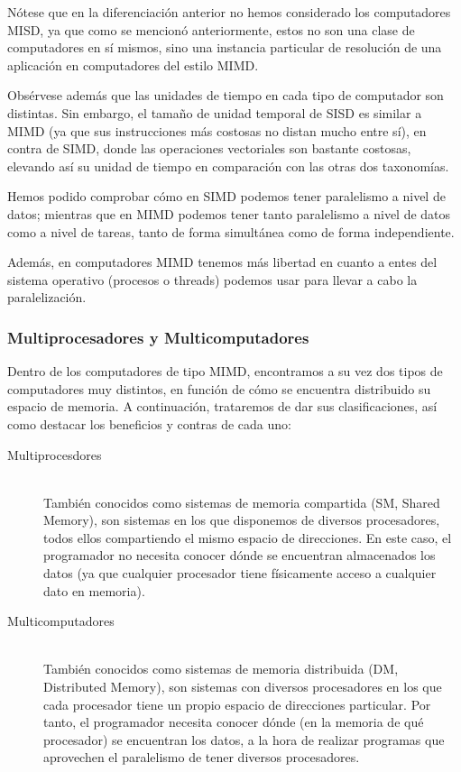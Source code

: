 \begin{observacion}
    Nótese que en la diferenciación anterior no hemos considerado los computadores MISD, ya que como se mencionó anteriormente, estos no son una clase de computadores en sí mismos, sino una instancia particular de resolución de una aplicación en computadores del estilo MIMD.

    Obsérvese además que las unidades de tiempo en cada tipo de computador son distintas. Sin embargo, el tamaño de unidad temporal de SISD es similar a MIMD (ya que sus instrucciones más costosas no distan mucho entre sí), en contra de SIMD, donde las operaciones vectoriales son bastante costosas, elevando así su unidad de tiempo en comparación con las otras dos taxonomías.

    Hemos podido comprobar cómo en SIMD podemos tener paralelismo a nivel de datos; mientras que en MIMD podemos tener tanto paralelismo a nivel de datos como a nivel de tareas, tanto de forma simultánea como de forma independiente.

    Además, en computadores MIMD tenemos más libertad en cuanto a entes del sistema operativo (procesos o threads) podemos usar para llevar a cabo la paralelización.
\end{observacion}

\subsubsection{Multiprocesadores y Multicomputadores}
Dentro de los computadores de tipo MIMD, encontramos a su vez dos tipos de computadores muy distintos, en función de cómo se encuentra distribuido su espacio de memoria. A continuación, trataremos de dar sus clasificaciones, así como destacar los beneficios y contras de cada uno:
\begin{description}
    \item [Multiprocesdores]~\\
        También conocidos como sistemas de memoria compartida (SM, Shared Memory), son sistemas en los que disponemos de diversos procesadores, todos ellos compartiendo el mismo espacio de direcciones. En este caso, el programador no necesita conocer dónde se encuentran almacenados los datos (ya que cualquier procesador tiene físicamente acceso a cualquier dato en memoria).
    \item [Multicomputadores]~\\
        También conocidos como sistemas de memoria distribuida (DM, Distributed Memory), son sistemas con diversos procesadores en los que cada procesador tiene un propio espacio de direcciones particular. Por tanto, el programador necesita conocer dónde (en la memoria de qué procesador) se encuentran los datos, a la hora de realizar programas que aprovechen el paralelismo de tener diversos procesadores.
\end{description}

